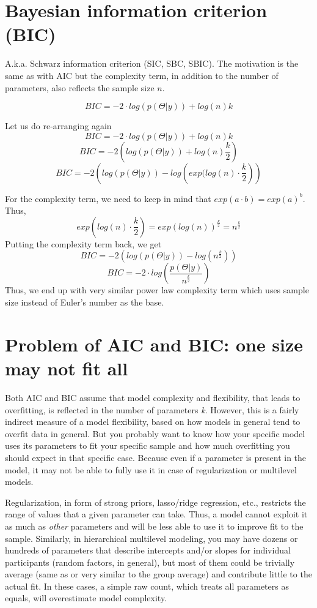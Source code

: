 \documentclass[
]{book}
\begin{document}
\hypertarget{bayesian-information-criterion-bic}{%
\section{Bayesian information criterion (BIC)}\label{bayesian-information-criterion-bic}}

A.k.a. Schwarz information criterion (SIC, SBC, SBIC). The motivation is the same as with AIC but the complexity term, in addition to the number of parameters, also reflects the sample size \(n\).

\[BIC = -2\cdot log(p(\Theta|y)) + log(n) k \]

Let us do re-arranging again
\[BIC = -2\cdot log(p(\Theta|y)) + log(n) k \]
\[BIC = -2 \left( log(p(\Theta|y)) + log(n) \frac{k}{2} \right) \]
\[BIC = -2 \left( log(p(\Theta|y)) - log \left(exp(log(n) \cdot \frac{k}{2} \right) \right) \]

For the complexity term, we need to keep in mind that \(exp(a \cdot b) = exp(a)^b\). Thus,
\[exp \left(log(n) \cdot \frac{k}{2} \right)= exp(log(n)) ^ \frac{k}{2} = n^\frac{k}{2}\]
Putting the complexity term back, we get
\[BIC = -2 \left( log(p(\Theta|y)) - log \left(n^\frac{k}{2} \right) \right)\]
\[BIC = -2 \cdot log \left(\frac{p(\Theta|y)}{n^\frac{k}{2}} \right)\]
Thus, we end up with very similar power law complexity term which uses sample size instead of Euler's number as the base.

\hypertarget{problem-of-aic-and-bic-one-size-may-not-fit-all}{%
\section{Problem of AIC and BIC: one size may not fit all}\label{problem-of-aic-and-bic-one-size-may-not-fit-all}}

Both AIC and BIC assume that model complexity and flexibility, that leads to overfitting, is reflected in the number of parameters \emph{k}. However, this is a fairly indirect measure of a model flexibility, based on how models in general tend to overfit data in general. But you probably want to know how your specific model uses its parameters to fit your specific sample and how much overfitting you should expect in that specific case. Because even if a parameter is present in the model, it may not be able to fully use it in case of regularization or multilevel models.

Regularization, in form of strong priors, lasso/ridge regression, etc., restricts the range of values that a given parameter can take. Thus, a model cannot exploit it as much as \emph{other} parameters and will be less able to use it to improve fit to the sample. Similarly, in hierarchical multilevel modeling, you may have dozens or hundreds of parameters that describe intercepts and/or slopes for individual participants (random factors, in general), but most of them could be trivially average (same as or very similar to the group average) and contribute little to the actual fit. In these cases, a simple raw count, which treats all parameters as equals, will overestimate model complexity.
\end{document}
